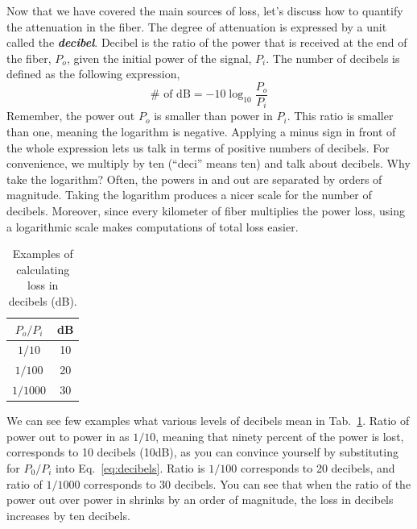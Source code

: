 Now that we have covered the main sources of loss, let's discuss how to quantify the attenuation in the fiber.
The degree of attenuation is expressed by a unit called the \textbf{\emph{decibel}}.
Decibel is the ratio of the power that is received at the end of the fiber, $P_o$, given the initial power of the signal, $P_i$.
The number of decibels is defined as the following expression,
\begin{equation}
    \# \text { of } \mathrm{dB}=-10 \log _{10} \frac{P_o}{P_i}
    \label{eq:decibels}
\end{equation}
Remember, the power out $P_o$ is smaller than power in $P_i$.
This ratio is smaller than one, meaning the logarithm is negative.
Applying a minus sign in front of the whole expression lets us talk in terms of positive numbers of decibels.
For convenience, we multiply by ten (``deci'' means ten) and talk about decibels.
Why take the logarithm?
Often, the powers in and out are separated by orders of magnitude.
Taking the logarithm produces a nicer scale for the number of decibels.
Moreover, since every kilometer of fiber multiplies the power loss, using a logarithmic scale makes computations of total loss easier.

\begin{table}
    \setcellgapes{3pt}
    \renewcommand\theadfont{}
    \makegapedcells
    \centering
    \begin{tabular}{cc}
        \hline
        \boldmath$P_o/P_i$ & \textbf{dB} \\
        \hline $1/10$ & 10 \\
        $1/100$ & 20 \\
        $1/1000$ & 30 \\
        \hline
    \end{tabular}
    \caption[Decibels example.]{Examples of calculating loss in decibels (dB).}
    \label{tab:decibels}
\end{table}

We can see few examples what various levels of decibels mean in Tab.~\ref{tab:decibels}.
Ratio of power out to power in as $1/10$, meaning that ninety percent of the power is lost, corresponds to 10 decibels (10dB), as you can convince yourself by substituting for $P_0/P_i$ into Eq.~\ref{eq:decibels}.
Ratio is $1/100$ corresponds to 20 decibels, and ratio of $1/1000$ corresponds to 30 decibels.
You can see that when the ratio of the power out over power in shrinks by an order of magnitude, the loss in decibels increases by ten decibels.

